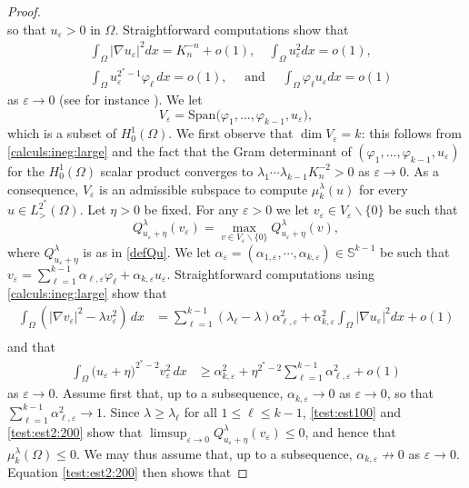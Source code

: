 \documentclass[10pt]{amsart}
\numberwithin{equation}{section}
\newcommand{\ve}{\varepsilon}
\newcommand{\vp}{\varphi}
\newcommand{\Om}{\Omega}
\newcommand{\mkl}{\mu_{k}^{\lambda}}
\theoremstyle{plain}
\theoremstyle{remark}
\begin{document}
\begin{proof}
\begin{equation*}
	\end{equation*}
so that $u_\ve >0 $ in $\Om$. Straightforward computations show that
\begin{equation} \label{calculs:ineg:large}
\begin{aligned}
& \int_{\Om} |\nabla u_\ve|^2 dx  = K_n^{-n} + o(1),  \quad  \int_{\Om} u_\ve^2 dx =o(1), \\
& \int_{\Om} u_{\ve}^{2^*-1} \varphi_{\ell}\, dx  = o(1),\quad \text{ and } \quad  
 \int_{\Om} \vp_\ell u_\ve dx =   o(1) 
 \end{aligned} 
\end{equation}
as $\ve \to 0$ (see for instance \cite{BN}). We let 
$$ V_\ve = \text{Span} \big( \vp_{1}, \dots, \vp_{k-1}, u_\ve\big), $$
which is a subset of $H^1_0(\Om)$. We first observe that $\dim V_\ve = k$: this follows from \eqref{calculs:ineg:large} and the fact that the Gram determinant of $( \vp_{1}, \dots, \vp_{k-1}, u_\ve)$ for the $H^1_0(\Om)$ scalar product converges to $ \lambda_1 \cdots \lambda_{k-1} K_n^{-2} >0 $ as $\ve \to 0$. As a consequence, $V_\ve$ is an admissible subspace to compute $\mu_k^{\lambda}(u)$ for every $u \in L^{2^*}_{>}(\Om)$. Let $\eta >0$ be fixed. For any $\ve >0$ we let $v_\ve \in V_\ve \backslash \{0\}$ be such that 
$$ Q_{u_\ve + \eta}^{\lambda}(v_\ve) = \max_{v \in V_\ve \backslash \{0\}} Q_{u_\ve + \eta}^{\lambda}(v), $$
where $Q_{u_\ve + \eta}^{\lambda}$ is as in \eqref{defQu}. We let $\alpha_\ve = (\alpha_{1,\ve}, \cdots, \alpha_{k, \ve}) \in \mathbb{S}^{k-1}$ be such that $v_\ve = \sum_{\ell=1}^{k-1} \alpha_{\ell,\ve} \vp_\ell + \alpha_{k,\ve} u_\ve$. Straightforward computations using \eqref{calculs:ineg:large} show that 
\begin{equation} \label{test:est100}
\begin{aligned}
  \int_{\Om} \left( |\nabla v_\ve|^2-\lambda v_\ve^2\right)\, dx & = \sum_{\ell=1}^{k-1} (\lambda_\ell - \lambda) \alpha_{\ell,\ve}^2+ \alpha_{k,\ve}^2 \int_{\Om} |\nabla u_\ve|^2 dx + o(1) \\
\end{aligned} 
\end{equation}
and that 
\begin{equation} \label{test:est2:200}
\begin{aligned}
	\int_{\Om} \big(u_{\ve} + \eta \big)^{2^*-2}v_\ve^2\, dx & \ge \alpha_{k,\ve}^2 
	 + \eta^{2^*-2}  \sum_{\ell=1}^{k-1}\alpha_{\ell,\ve}^2 + o(1)
	\end{aligned} 
\end{equation}
as $\ve \to 0$. Assume first that, up to a subsequence, $\alpha_{k, \ve} \to 0$ as $\ve \to 0$, so that $ \sum_{\ell=1}^{k-1}\alpha_{\ell,\ve}^2 \to 1$. Since $\lambda \ge \lambda_\ell$ for all $1 \le \ell \le k-1$, \eqref{test:est100} and  \eqref{test:est2:200} show that $\limsup_{\ve \to 0} Q_{u_\ve + \eta}^{\lambda}(v_\ve) \le 0$, and hence that $\mkl(\Om)  \le 0$. We may thus assume that, up to a subsequence, $\alpha_{k,\ve} \not \to 0$ as $\ve \to 0$. Equation  \eqref{test:est2:200}  then shows that 

\end{proof}
\end{document}
